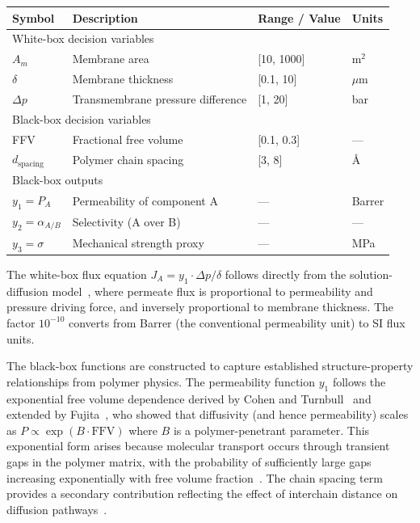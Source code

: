 \documentclass[12pt,a4paper]{article}%
\theoremstyle{plain}%
\theoremstyle{remark}%
\theoremstyle{definition}%
\begin{document}
\begin{appendices}
\begin{table}[htbp]
\begin{tabular}{@{}llll@{}}
\toprule
\textbf{Symbol} & \textbf{Description} & \textbf{Range / Value} & \textbf{Units} \\
\midrule
\multicolumn{4}{l}{White-box decision variables} \\
\midrule
$A_m$ & Membrane area & [10, 1000] & m$^2$ \\
$\delta$ & Membrane thickness & [0.1, 10] & $\mu$m \\
$\Delta p$ & Transmembrane pressure difference & [1, 20] & bar \\
\midrule
\multicolumn{4}{l}{Black-box decision variables} \\
\midrule
FFV & Fractional free volume & [0.1, 0.3] & --- \\
$d_{\text{spacing}}$ & Polymer chain spacing & [3, 8] & \AA \\
\midrule
\multicolumn{4}{l}{Black-box outputs} \\
\midrule
$y_1 = P_A$ & Permeability of component A & --- & Barrer \\
$y_2 = \alpha_{A/B}$ & Selectivity (A over B) & --- & --- \\
$y_3 = \sigma$ & Mechanical strength proxy & --- & MPa \\
\bottomrule
\end{tabular}
\end{table}

The white-box flux equation $J_A = y_1 \cdot \Delta p / \delta$ follows directly from the solution-diffusion model~\cite{wijmans1995solution}, where permeate flux is proportional to permeability and pressure driving force, and inversely proportional to membrane thickness. The factor $10^{-10}$ converts from Barrer (the conventional permeability unit) to SI flux units.

The black-box functions are constructed to capture established structure-property relationships from polymer physics. The permeability function $y_1$ follows the exponential free volume dependence derived by Cohen and Turnbull~\cite{cohen1959molecular} and extended by Fujita~\cite{fujita1961diffusion}, who showed that diffusivity (and hence permeability) scales as $P \propto \exp(B \cdot \text{FFV})$ where $B$ is a polymer-penetrant parameter. This exponential form arises because molecular transport occurs through transient gaps in the polymer matrix, with the probability of sufficiently large gaps increasing exponentially with free volume fraction~\cite{matteucci2006transport}. The chain spacing term provides a secondary contribution reflecting the effect of interchain distance on diffusion pathways~\cite{lee1980selection}.


\end{appendices}
\end{document}
